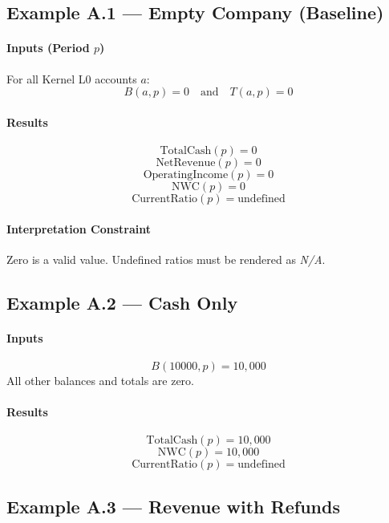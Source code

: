\documentclass[11pt]{article}
\newcommand{\Balance}{B}
\newcommand{\Total}{T}
\newcommand{\Period}{p}
\begin{document}
\subsection{Example A.1 — Empty Company (Baseline)}

\paragraph{Inputs (Period $\Period$)}
For all Kernel L0 accounts $a$:
\[
\Balance(a,\Period) = 0
\quad\text{and}\quad
\Total(a,\Period) = 0
\]

\paragraph{Results}
\[
\text{TotalCash}(\Period) = 0
\]
\[
\text{NetRevenue}(\Period) = 0
\]
\[
\text{OperatingIncome}(\Period) = 0
\]
\[
\text{NWC}(\Period) = 0
\]
\[
\text{CurrentRatio}(\Period) = \text{undefined}
\]

\paragraph{Interpretation Constraint}
Zero is a valid value.
Undefined ratios must be rendered as \emph{N/A}.

\subsection{Example A.2 — Cash Only}

\paragraph{Inputs}
\[
\Balance(10000,\Period) = 10{,}000
\]
All other balances and totals are zero.

\paragraph{Results}
\[
\text{TotalCash}(\Period) = 10{,}000
\]
\[
\text{NWC}(\Period) = 10{,}000
\]
\[
\text{CurrentRatio}(\Period) = \text{undefined}
\]

\subsection{Example A.3 — Revenue with Refunds}
\end{document}
